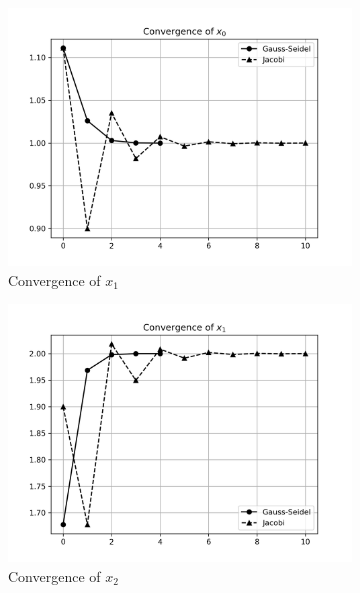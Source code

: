 \documentclass[12,a4paper]{article}
\begin{document}
    \begin{figure}[H]
        \centering
        \begin{subfigure}[t]{0.49\textwidth}
            \includegraphics[width=\textwidth]{plots/Convergence_of_x0.png}
            \caption{Convergence of $x_1$}
            \label{fig:conv_x1}
        \end{subfigure}
        \begin{subfigure}[t]{0.49\textwidth}
            \includegraphics[width=\textwidth]{plots/Convergence_of_x1.png}
            \caption{Convergence of $x_2$}
            \label{fig:conv_x2}
        \end{subfigure}
        \begin{subfigure}[t]{0.49\textwidth}

\end{subfigure}
\end{figure}
\end{document}
